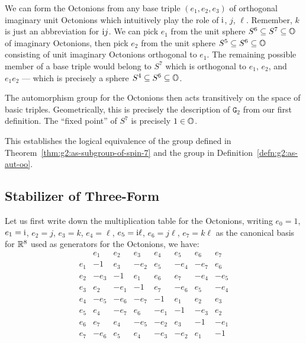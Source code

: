We can form the Octonions from any base triple $(e_{1}, e_{2}, e_{3})$
of orthogonal imaginary unit Octonions which intuitively play the role
of $\mathrm{i}$, $j$, $\ell$. Remember, $k$ is just an abbreviation for $\mathrm{i} j$.
We can pick $e_{1}$ from the unit sphere $S^{6}\subseteq S^{7}\subseteq\mathbb{O}$ of imaginary
Octonions, then pick $e_{2}$ from the unit sphere $S^{5}\subseteq S^{6}\subseteq\mathbb{O}$
consisting of unit imaginary Octonions orthogonal to $e_{1}$.
The remaining possible member of a base triple would belong to $S^{7}$
which is orthogonal to $e_{1}$, $e_{2}$, and $e_{1}e_{2}$ --- which is
precisely a sphere $S^{4}\subseteq S^{6}\subseteq\mathbb{O}$.

The automorphism group for the Octonions then acts transitively on the
space of basic triples. Geometrically, this is precisely the description
of $\mathtt{G}_{2}$ from our first definition. The ``fixed point'' of
$S^{7}$ is precisely $1\in\mathbb{O}$.

This establishes the logical equivalence of
the group defined in Theorem~\ref{thm:g2:as-subgroup-of-spin-7}
and the group in Definition~\ref{defn:g2:as-aut-oo}.

\subsection{Stabilizer of Three-Form}

Let us first write down the multiplication table for the Octonions,
writing $e_{0}=1$, $e_{1}=\mathrm{i}$, $e_{2}=j$, $e_{3}=k$, $e_{4}=\ell$,
$e_{5}=\mathrm{i}\ell$, $e_{6}=j\ell$, $e_{7}=k\ell$ as the canonical basis for 
$\mathbb{R}^{8}$ used as generators for the Octonions, we have:
\begin{equation}
\begin{array}{c||c|c|c|c|c|c|c}
      & e_{1}  & e_{2}  & e_{3} & e_{4} & e_{5} & e_{6} & e_{7}\\ \hline\hline
e_{1} & -1     & e_{3}  & -e_{2} & e_{5} & -e_{4} & -e_{7} & e_{6}\\ \hline
e_{2} & -e_{3} & -1     & e_{1} & e_{6}  & e_{7} & -e_{4} & -e_{5}\\ \hline
e_{3} & e_{2} & -e_{1} & -1    & e_{7}  & -e_{6} & e_{5} & -e_{4}\\ \hline
e_{4} & -e_{5}  & -e_{6} & -e_{7} & -1    & e_{1} & e_{2} & e_{3}\\ \hline
e_{5} & e_{4} & -e_{7} & e_{6} & -e_{1} & -1   & -e_{3} & e_{2}\\ \hline
e_{6} & e_{7}  & e_{4} & -e_{5}  & -e_{2} & e_{3} & -1 & -e_{1}\\ \hline
e_{7} & -e_{6}  & e_{5}  & e_{4} & -e_{3}  & -e_{2} & e_{1} & -1
\end{array}
\end{equation}

